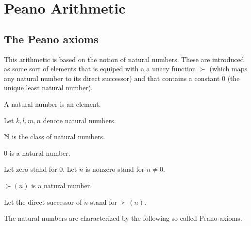 \documentclass[../../arithmetic.tex]{subfiles}
\begin{document}
  \section{Peano Arithmetic}

  \begin{forthel}
  \end{forthel}

  \begin{forthel}
  \end{forthel}


  \subsection{The Peano axioms}

  This arithmetic is based on the notion of natural numbers.
  These are introduced as some sort of elements that is equiped with a a unary
  function $\succ$ (which maps any natural number to its direct successor)
  and that contains a constant $0$ (the unique least natural number).

  \begin{forthel}
    \begin{signature}
      A natural number is an element.
    \end{signature}

    Let $k,l,m,n$ denote natural numbers.

    \begin{definition}
      $\mathbb{N}$ is the class of natural numbers.
    \end{definition}

    \begin{signature}
      $0$ is a natural number.
    \end{signature}

    Let zero stand for $0$.
    Let $n$ is nonzero stand for $n \neq 0$.

    \begin{signature}
      $\succ(n)$ is a natural number.
    \end{signature}

    Let the direct successor of $n$ stand for $\succ(n)$.
  \end{forthel}

  \noindent The natural numbers are characterized by the following so-called
  Peano axioms.
\end{document}
